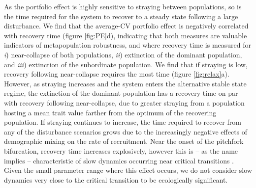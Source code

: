 \documentclass{revtex4}
\begin{document}
As the portfolio effect is highly sensitive to straying between populations, so is the time required for the system to recover to a steady state following a large disturbance.
We find that the average-CV portfolio effect is negatively correlated with recovery time (figure \ref{fig:PE}d), indicating that both measures are valuable indicators of metapopulation robustness, and where recovery time is measured for \emph{i}) near-collapse of both populations, \emph{ii}) extinction of the dominant population, and \emph{iii}) extinction of the subordinate population.
We find that if straying is low, recovery following near-collapse requires the most time (figure \ref{fig:relax}a).
However, as straying increases and the system enters the alternative stable state regime, the extinction of the dominant population has a recovery time on-par with recovery following near-collapse, due to greater straying from a population hosting a mean trait value farther from the optimum of the recovering population.
If straying continues to increase, the time required to recover from any of the disturbance scenarios grows due to the increasingly negative effects of demographic mixing on the rate of recruitment.
Near the onset of the pitchfork bifurcation, recovery time increases explosively, however this is -- as the name implies -- characteristic of slow dynamics occurring near critical transitions \citep{Scheffer:2009gg,Kuehn:2010p2591}.
Given the small parameter range where this effect occurs, we do not consider slow dynamics very close to the critical transition to be ecologically significant.
\end{document}
